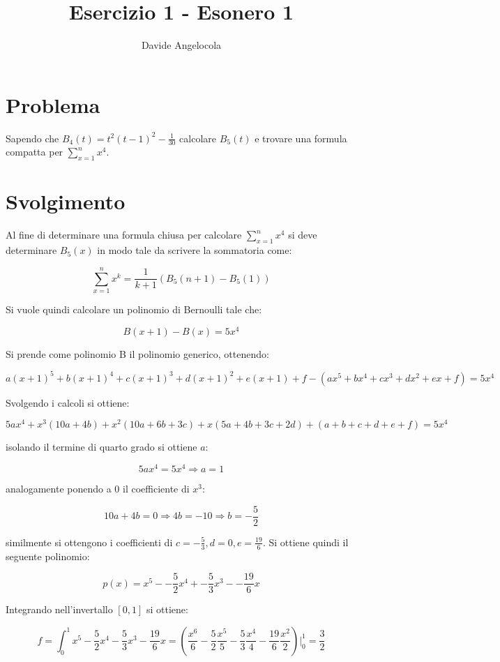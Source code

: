 \documentclass{article}
\title{Esercizio 1 - Esonero 1}
\author{Davide Angelocola}
\begin{document}
\maketitle

\section{Problema}

Sapendo che $B_4(t) = t^2(t-1)^2 - \frac{1}{30}$ calcolare $B_5(t)$ e trovare una formula compatta per $\sum_{x=1}^{n}{x^4}$.

\section{Svolgimento}

Al fine di determinare una formula chiusa per calcolare $\sum_{x=1}^{n}{x^4}$ si
deve determinare $B_5(x)$ in modo tale da scrivere la sommatoria come:

$$\sum_{x=1}^{n}{x^k} = \frac{1}{k+1} (B_5(n+1) - B_5(1))$$\label{1}

Si vuole quindi calcolare un polinomio di Bernoulli tale che:

$$B(x+1) - B(x) = 5x^4$$

Si prende come polinomio B il polinomio generico, ottenendo:

$$a(x+1)^5+b(x+1)^4+c(x+1)^3+d(x+1)^2+e(x+1)+f - (ax^5+bx^4+cx^3+dx^2+ex+f) = 5x^4$$

Svolgendo i calcoli si ottiene:

$$5ax^4 + x^3(10a+4b) + x^2(10a+6b+3c)+x(5a+4b+3c+2d)+(a+b+c+d+e+f)=5x^4$$ 

isolando il termine di quarto grado si ottiene $a$:

$$5ax^4=5x^4 \Rightarrow a = 1$$

analogamente ponendo a 0 il coefficiente di $x^3$:

$$10a + 4b = 0 \Rightarrow 4b = -10 \Rightarrow b = -\frac{5}{2}$$

similmente si ottengono i coefficienti di $c = -\frac{5}{3}, d = 0, e = \frac{19}{6}$. Si ottiene quindi il seguente polinomio:

$$p(x) = x^5 - -\frac{5}{2}x^4 + -\frac{5}{3}x^3 - -\frac{19}{6}x$$

Integrando nell'invertallo $[0, 1]$ si ottiene:

$$f = \int_0^1{x^5 -\frac{5}{2}x^4 -\frac{5}{3}x^3 -\frac{19}{6}x} = (\frac{x^6}{6} - \frac{5}{2}\frac{x^5}{5} -\frac{5}{3}\frac{x^4}{4} -  \frac{19}{6}\frac{x^2}{2})|_0^1 = \frac{3}{2}$$ 
\end{document}

